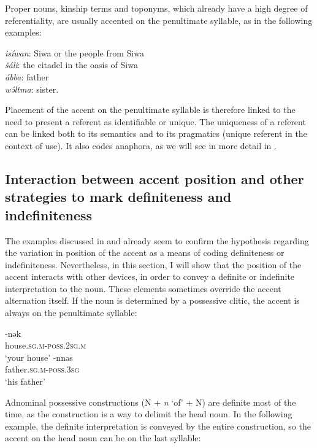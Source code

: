 \documentclass[output=paper]{langsci/langscibook}
\begin{document}
Proper nouns, kinship terms and toponyms, which already have a high degree of referentiality, are usually accented on the penultimate syllable, as in the following examples:

\begin{exe}
\exi{}
{\emph{isíwan}}: Siwa or the people from Siwa \\
{\emph{šáli}}: the citadel in the oasis of Siwa \\
{\emph{ábba}}: father \\
{\emph{wə́ltma}}: sister. 
\end{exe}

{
Placement of the accent on the penultimate syllable is therefore linked to the need to present a referent as identifiable or unique. The uniqueness of a referent can be linked both to its semantics and to its pragmatics (unique referent in the context of use). It also codes anaphora, as we will see in more detail in .
}

\subsection{Interaction between accent position and other strategies to mark definiteness and indefiniteness}\label{5sec:24}

The examples discussed in  and  already seem to confirm the hypothesis regarding the variation in position of the accent as a means of coding definiteness or indefiniteness. Nevertheless, in this section, I will show that the position of the accent interacts with other devices, in order to convey a definite or indefinite interpretation to the noun. These elements sometimes override the accent alternation itself. If the noun is determined by a possessive clitic, the accent is always on the penultimate syllable:

\begin{exe}
\ex\label{5ex:22}
-nək \\
	house.{\textsc{sg.m-poss.2sg.m}} \\
\glt	`your house'
\ex\label{5ex:23}
-nnəs \\
	father.{\textsc{sg.m-poss.3sg}} \\
\glt	`his father'
\end{exe}

Adnominal possessive constructions (N + {\emph{n}} `of' + N) are definite most of the time, as the construction is a way to delimit the head noun. In the following example, the definite interpretation is conveyed by the entire construction, so the accent on the head noun can be on the last syllable:
\end{document}
